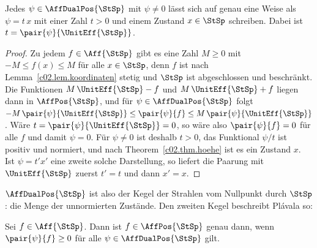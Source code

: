 \begin{vertiefung}
  \begin{lemma}\label{c02.lem.basis}
    Jedes $\psi \in \AffDualPos{\StSp}$ mit $\psi \neq 0$ lässt sich auf genau eine Weise
    als $\psi = t\, x$ mit einer Zahl $t > 0$ und einem Zustand $x \in \StSp$ schreiben.
    Dabei ist $t = \pair{\psi}{\UnitEff{\StSp}}$.
  \end{lemma}
  \begin{proof}
    Zu jedem $f \in \Aff{\StSp}$ gibt es eine Zahl $M \geq 0$ mit
    $-M \leq f(x) \leq M$ für alle $x \in \StSp$, denn $f$ ist nach
    Lemma~\ref{c02.lem.koordinaten} stetig und $\StSp$ ist abgeschlossen und beschränkt.
    Die Funktionen $M\,\UnitEff{\StSp} - f$ und $M\,\UnitEff{\StSp} + f$ liegen dann in
    $\AffPos{\StSp}$, und für $\psi \in \AffDualPos{\StSp}$ folgt
    $-M\, \pair{\psi}{\UnitEff{\StSp}} \leq \pair{\psi}{f} \leq M\, \pair{\psi}{\UnitEff{\StSp}}$.
    Wäre $t = \pair{\psi}{\UnitEff{\StSp}} = 0$, so wäre also $\pair{\psi}{f} = 0$ für
    alle $f$ und damit $\psi = 0$. Für $\psi \neq 0$ ist deshalb $t > 0$, das Funktional
    $\psi / t$ ist positiv und normiert, und nach Theorem~\ref{c02.thm.hoehe} ist es ein
    Zustand $x$. Ist $\psi = t' x'$ eine zweite solche Darstellung, so liefert die Paarung
    mit $\UnitEff{\StSp}$ zuerst $t' = t$ und dann $x' = x$.
  \end{proof}

  $\AffDualPos{\StSp}$ ist also der Kegel der Strahlen vom Nullpunkt durch $\StSp$: die
  Menge der unnormierten Zustände. Den zweiten Kegel beschreibt Plávala so:

  \begin{lemma}\label{c02.lem.dualkegel}
    Sei $f \in \Aff{\StSp}$. Dann ist $f \in \AffPos{\StSp}$ genau dann, wenn
    $\pair{\psi}{f} \geq 0$ für alle $\psi \in \AffDualPos{\StSp}$ gilt.
  \end{lemma}


\end{vertiefung}
